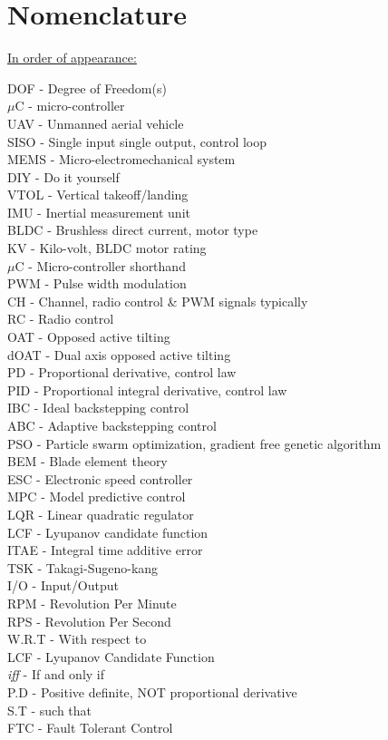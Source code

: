 \documentclass[a4paper, 11pt, oneside, openright, parskip=full]{book}
\begin{document}
\chapter{Nomenclature}
\label{ch:nom}
\underline{In order of appearance:}
\par
DOF - Degree of Freedom(s)\\
$\mu$C - micro-controller\\
UAV - Unmanned aerial vehicle\\
SISO - Single input single output, control loop\\
MEMS - Micro-electromechanical system\\
DIY - Do it yourself\\
VTOL - Vertical takeoff/landing\\
IMU - Inertial measurement unit\\
BLDC - Brushless direct current, motor type\\
KV - Kilo-volt, BLDC motor rating\\
$\mu$C - Micro-controller shorthand\\
PWM - Pulse width modulation\\
CH - Channel, radio control \& PWM signals typically\\
RC - Radio control\\
OAT - Opposed active tilting\\
dOAT - Dual axis opposed active tilting\\
PD - Proportional derivative, control law\\
PID - Proportional integral derivative, control law\\
IBC - Ideal backstepping control\\
ABC - Adaptive backstepping control\\
PSO - Particle swarm optimization, gradient free genetic algorithm\\
BEM - Blade element theory\\
ESC - Electronic speed controller\\
MPC - Model predictive control\\
LQR - Linear quadratic regulator\\
LCF - Lyupanov candidate function\\
ITAE - Integral time additive error\\
TSK - Takagi-Sugeno-kang\\
I/O - Input/Output\\
RPM - Revolution Per Minute\\
RPS - Revolution Per Second\\
W.R.T - With respect to\\
LCF - Lyupanov Candidate Function\\
\emph{iff} - If and only if\\
P.D - Positive definite, NOT proportional derivative\\
S.T - such that\\
FTC - Fault Tolerant Control
\end{document}
